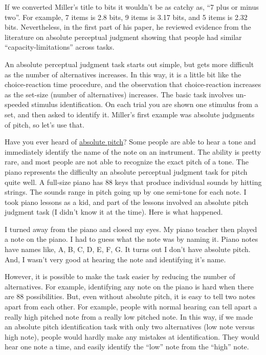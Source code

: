 \documentclass[
  oneside,
  12pt]{crumpbook}
\begin{document}
If we converted Miller's title to bits it wouldn't be as catchy as, ``7 plus or minus two''. For example, 7 items is 2.8 bits, 9 items is 3.17 bits, and 5 items is 2.32 bits. Nevertheless, in the first part of his paper, he reviewed evidence from the literature on absolute perceptual judgment showing that people had similar ``capacity-limitations'' across tasks.

An absolute perceptual judgment task starts out simple, but gets more difficult as the number of alternatives increases. In this way, it is a little bit like the choice-reaction time procedure, and the observation that choice-reaction increases as the set-size (number of alternatives) increases. The basic task involves un-speeded stimulus identification. On each trial you are shown one stimulus from a set, and then asked to identify it. Miller's first example was absolute judgments of pitch, so let's use that.

Have you ever heard of \href{https://en.wikipedia.org/wiki/Absolute_pitch}{absolute pitch}? Some people are able to hear a tone and immediately identify the name of the note on an instrument. The ability is pretty rare, and most people are not able to recognize the exact pitch of a tone. The piano represents the difficulty an absolute perceptual judgment task for pitch quite well. A full-size piano has 88 keys that produce individual sounds by hitting strings. The sounds range in pitch going up by one semi-tone for each note. I took piano lessons as a kid, and part of the lessons involved an absolute pitch judgment task (I didn't know it at the time). Here is what happened.

I turned away from the piano and closed my eyes. My piano teacher then played a note on the piano. I had to guess what the note was by naming it. Piano notes have names like, A, B, C, D, E, F, G. It turns out I don't have absolute pitch. And, I wasn't very good at hearing the note and identifying it's name.

However, it is possible to make the task easier by reducing the number of alternatives. For example, identifying any note on the piano is hard when there are 88 possibilities. But, even without absolute pitch, it is easy to tell two notes apart from each other. For example, people with normal hearing can tell apart a really high pitched note from a really low pitched note. In this way, if we made an absolute pitch identification task with only two alternatives (low note versus high note), people would hardly make any mistakes at identification. They would hear one note a time, and easily identify the ``low'' note from the ``high'' note.
\end{document}
